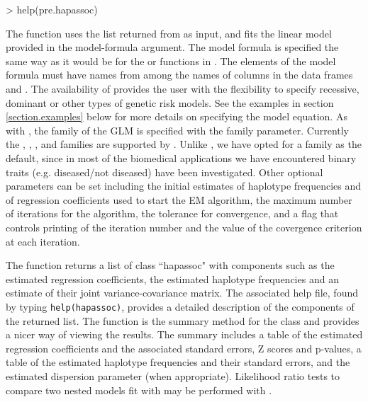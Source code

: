 \documentclass[article, shortnames]{jss}
\begin{document}
\begin{Schunk}
\begin{Sinput}
> help(pre.hapassoc)
\end{Sinput}
\end{Schunk}

The function  uses the list returned from 
 as input, and fits the linear model provided in the
model-formula argument. The model formula is specified the same way as it
would be for the  or  functions in . 
The elements of the model formula must have names from among the names of 
columns in the data frames  and .
The availability of 
provides the user with the flexibility to specify recessive, dominant
or other types of genetic risk models.
See the examples in section \ref{section.examples} below for more details 
on specifying the model equation. As with , the family of the 
GLM is specified with the family parameter. Currently 
the , , ,
and  families are supported by . 
Unlike , we have opted for a 
family as the default,
since in most of the biomedical applications 
we have encountered 
binary traits (e.g. diseased/not diseased) have been investigated.
Other optional parameters 
can be set including the initial estimates of haplotype frequencies and of 
regression coefficients used to start the EM algorithm, the maximum number 
of iterations for the algorithm,
the tolerance for convergence,
and a  flag that controls 
printing of the iteration number and the value of 
the covergence criterion at each iteration.

The function returns a list of class ``hapassoc" with components such as the 
estimated regression coefficients, the estimated haplotype frequencies and an 
estimate of their joint variance-covariance matrix. The associated
help file, found by typing \texttt{help(hapassoc)},
provides a detailed description of the components
of the returned list.
The function  is the 
summary method for the class and provides a nicer way of viewing the
results. The summary includes a table of the estimated regression 
coefficients and the associated standard errors, Z scores and p-values, 
a table of the estimated haplotype frequencies and their standard errors, 
and the estimated dispersion parameter (when appropriate).
Likelihood ratio tests to compare
two nested models fit with  may be performed with
. 
\end{document}

